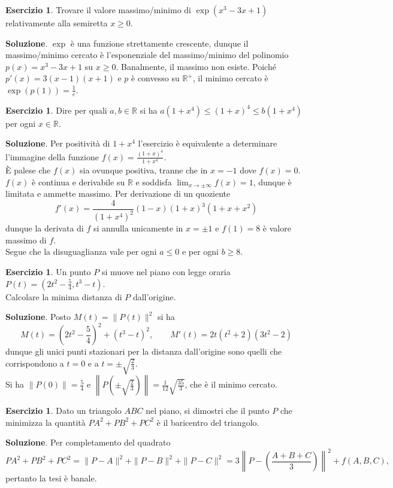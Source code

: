 \documentclass[a4paper,twoside]{article}
\newcommand{\R}{\mathbb{R}}
\theoremstyle{definition}
\newtheorem{ex}[theorem]{Esercizio}
\numberwithin{theorem}{section}
\begin{document}
\begin{ex} Trovare il valore massimo/minimo di $\exp(x^3-3x+1)$ relativamente alla semiretta $x\geq 0$.\end{ex}
\textbf{Soluzione}. $\exp$ è una funzione strettamente crescente, dunque il massimo/minimo cercato è l'esponenziale del massimo/minimo del polinomio $p(x)=x^3-3x+1$ su $x\geq 0$. Banalmente, il massimo non esiste. Poiché $p'(x)=3(x-1)(x+1)$ e $p$ è convesso su $\R^+$, il minimo cercato è $\exp\left(p(1)\right)=\frac{1}{e}$.

\begin{ex} Dire per quali $a,b\in\R$ si ha $a(1+x^4)\leq(1+x)^4\leq b(1+x^4)$ per ogni $x\in\R$.\end{ex}
\textbf{Soluzione}. Per positività di $1+x^4$ l'esercizio è equivalente a determinare l'immagine della funzione $f(x)=\frac{(1+x)^4}{1+x^4}$.\\
È palese che $f(x)$ sia ovunque positiva, tranne che in $x=-1$ dove $f(x)=0$. $f(x)$ è continua e derivabile su $\R$ e soddisfa $\lim_{x\to \pm\infty}f(x)=1$, dunque è limitata e ammette massimo. Per derivazione di un quoziente 
$$ f'(x) = \frac{4}{(1+x^4)^2}(1-x)(1+x)^3(1+x+x^2) $$
dunque la derivata di $f$ si annulla unicamente in $x=\pm 1$ e $f(1)=8$ è valore massimo di $f$.\\ Segue che la disuguaglianza vale per ogni $a\leq 0$ e per ogni $b\geq 8$.

\begin{ex} Un punto $P$ si muove nel piano con legge oraria $P(t)=\left(2t^2-\frac{5}{4},t^3-t\right)$.\\ Calcolare la minima distanza di $P$ dall'origine.\end{ex}
\textbf{Soluzione}. Posto $M(t)=\|P(t)\|^2$ si ha 
$$ M(t) = \left(2t^2-\frac{5}{4}\right)^2+\left(t^3-t\right)^2,\qquad M'(t) = 2t(t^2+2)(3t^2-2)$$
dunque gli unici punti stazionari per la distanza dall'origine sono quelli che corrispondono a $t=0$ e a $t=\pm\sqrt{\frac{2}{3}}$.\\ Si ha $\|P(0)\|=\frac{5}{4}$ e $\left\|P\left(\pm\sqrt{\frac{2}{3}}\right)\right\|=\frac{1}{12}\sqrt{\frac{35}{3}}$, che è il minimo cercato.

\begin{ex} Dato un triangolo $ABC$ nel piano, si dimostri che il punto $P$ che minimizza la quantità ${PA^2+PB^2+PC^2}$ è il baricentro del triangolo. 
\end{ex}
\textbf{Soluzione}. Per completamento del quadrato 
$$ PA^2+PB^2+PC^2=\|P-A\|^2 + \|P-B\|^2 + \|P-C\|^2 = 3\left\|P-\left(\frac{A+B+C}{3}\right)\right\|^2 + f(A,B,C), $$
pertanto la tesi è banale.
\end{document}
